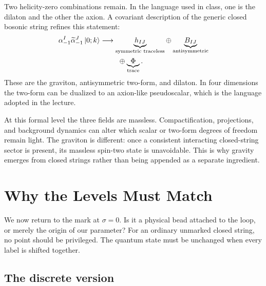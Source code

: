 Two helicity-zero combinations remain. In the language used in class, one is
the dilaton and the other the axion. A covariant description of the generic
closed bosonic string refines this statement:
\begin{equation}
  \begin{aligned}
    \alpha_{-1}^{I}\widetilde\alpha_{-1}^{J}\left\lvert0;k\right\rangle
    &\longrightarrow
    \underbrace{h_{IJ}}_{\text{symmetric traceless}}
    \oplus
    \underbrace{B_{IJ}}_{\text{antisymmetric}}\\
    &\hspace{2.5em}\oplus
    \underbrace{\Phi}_{\text{trace}}.
  \end{aligned}
  \label{eq:l04-massless-tensor-decomposition}
\end{equation}
These are the graviton, antisymmetric two-form, and dilaton. In four
dimensions the two-form can be dualized to an axion-like pseudoscalar, which
is the language adopted in the lecture.

At this formal level the three fields are massless. Compactification,
projections, and background dynamics can alter which scalar or two-form
degrees of freedom remain light. The graviton is different: once a
consistent interacting closed-string sector is present, its massless
spin-two state is unavoidable. This is why gravity emerges from closed
strings rather than being appended as a separate ingredient.

\section{Why the Levels Must Match}

We now return to the mark at \(\sigma=0\). Is it a physical bead attached to
the loop, or merely the origin of our parameter? For an ordinary unmarked
closed string, no point should be privileged. The quantum state must be
unchanged when every label is shifted together.

\subsection{The discrete version}

